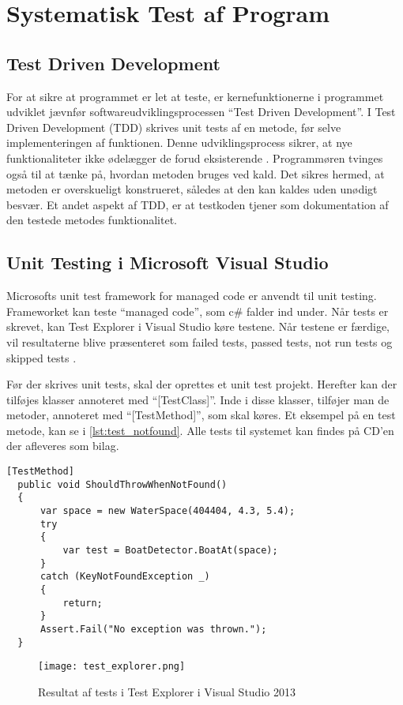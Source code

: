 \section{Systematisk Test af Program}
\label{sec:systematisk_test_af_program}

\subsection{Test Driven Development}
\label{sub:test_driven_development}


For at sikre at programmet er let at teste, er kernefunktionerne i programmet udviklet jævnfør softwareudviklingsprocessen \enquote{Test Driven Development}. I Test Driven Development (TDD) skrives unit tests af en metode, før selve implementeringen af funktionen. Denne udviklingsprocess sikrer, at nye funktionaliteter ikke ødelægger de forud eksisterende \cite{martin2006agile}. Programmøren tvinges også til at tænke på, hvordan metoden bruges ved kald. Det sikres hermed, at metoden er overskueligt konstrueret, således at den kan kaldes uden unødigt besvær. Et andet aspekt af TDD, er at testkoden tjener som dokumentation af den testede metodes funktionalitet.

\subsection{Unit Testing i Microsoft Visual Studio}
\label{sub:unit_testing_i_microsoft_visual_studio}

Microsofts unit test framework for managed code er anvendt til unit testing. Frameworket kan teste \enquote{managed code}, som c\# falder ind under. Når tests er skrevet, kan Test Explorer i Visual Studio køre testene. Når testene er færdige, vil resultaterne blive præsenteret som failed tests, passed tests, not run tests og skipped tests \cite{msdn_unittest}.

Før der skrives unit tests, skal der oprettes et unit test projekt. Herefter kan der tilføjes klasser annoteret med \enquote{[TestClass]}. Inde i disse klasser, tilføjer man de metoder, annoteret med \enquote{[TestMethod]}, som skal køres. Et eksempel på en test metode, kan se i \cref{lst:test_notfound}.
Alle tests til systemet kan findes på CD'en der afleveres som bilag.

\begin{lstlisting}[label=lst:test_notfound, caption={Eksempel på testfunktion}]
  [TestMethod]
  public void ShouldThrowWhenNotFound()
  {
      var space = new WaterSpace(404404, 4.3, 5.4);
      try
      {
          var test = BoatDetector.BoatAt(space);
      }
      catch (KeyNotFoundException _)
      {
          return;
      }
      Assert.Fail("No exception was thrown.");
  }
\end{lstlisting}



\begin{figure}
  \centering
  \texttt{[image: test\_explorer.png]}
  \caption{Resultat af tests i Test Explorer i Visual Studio 2013}
  \label{fig:test_explorer}
\end{figure}
